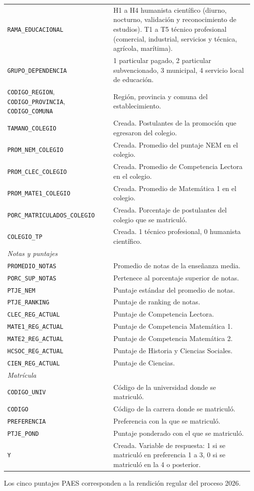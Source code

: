 \documentclass[11pt,letterpaper]{article}
\begin{document}
\begin{longtable}{p{5.2cm}p{9.8cm}}
\texttt{RAMA\_EDUCACIONAL} & H1 a H4 humanista científico (diurno, nocturno, validación y reconocimiento de estudios). T1 a T5 técnico profesional (comercial, industrial, servicios y técnica, agrícola, marítima). \\
\texttt{GRUPO\_DEPENDENCIA} & 1 particular pagado, 2 particular subvencionado, 3 municipal, 4 servicio local de educación. \\
\texttt{CODIGO\_REGION}, \texttt{CODIGO\_PROVINCIA}, \texttt{CODIGO\_COMUNA} & Región, provincia y comuna del establecimiento. \\
\texttt{TAMANO\_COLEGIO} & Creada. Postulantes de la promoción que egresaron del colegio. \\
\texttt{PROM\_NEM\_COLEGIO} & Creada. Promedio del puntaje NEM en el colegio. \\
\texttt{PROM\_CLEC\_COLEGIO} & Creada. Promedio de Competencia Lectora en el colegio. \\
\texttt{PROM\_MATE1\_COLEGIO} & Creada. Promedio de Matemática 1 en el colegio. \\
\texttt{PORC\_MATRICULADOS\_COLEGIO} & Creada. Porcentaje de postulantes del colegio que se matriculó. \\
\texttt{COLEGIO\_TP} & Creada. 1 técnico profesional, 0 humanista científico. \\
\midrule
\multicolumn{2}{l}{\textit{Notas y puntajes}} \\
\texttt{PROMEDIO\_NOTAS} & Promedio de notas de la enseñanza media. \\
\texttt{PORC\_SUP\_NOTAS} & Pertenece al porcentaje superior de notas. \\
\texttt{PTJE\_NEM} & Puntaje estándar del promedio de notas. \\
\texttt{PTJE\_RANKING} & Puntaje de ranking de notas. \\
\texttt{CLEC\_REG\_ACTUAL} & Puntaje de Competencia Lectora. \\
\texttt{MATE1\_REG\_ACTUAL} & Puntaje de Competencia Matemática 1. \\
\texttt{MATE2\_REG\_ACTUAL} & Puntaje de Competencia Matemática 2. \\
\texttt{HCSOC\_REG\_ACTUAL} & Puntaje de Historia y Ciencias Sociales. \\
\texttt{CIEN\_REG\_ACTUAL} & Puntaje de Ciencias. \\
\midrule
\multicolumn{2}{l}{\textit{Matrícula}} \\
\texttt{CODIGO\_UNIV} & Código de la universidad donde se matriculó. \\
\texttt{CODIGO} & Código de la carrera donde se matriculó. \\
\texttt{PREFERENCIA} & Preferencia con la que se matriculó. \\
\texttt{PTJE\_POND} & Puntaje ponderado con el que se matriculó. \\
\texttt{Y} & Creada. Variable de respuesta: 1 si se matriculó en preferencia 1 a 3, 0 si se matriculó en la 4 o posterior. \\
\end{longtable}

Los cinco puntajes PAES corresponden a la rendición regular del proceso 2026.
\end{document}
